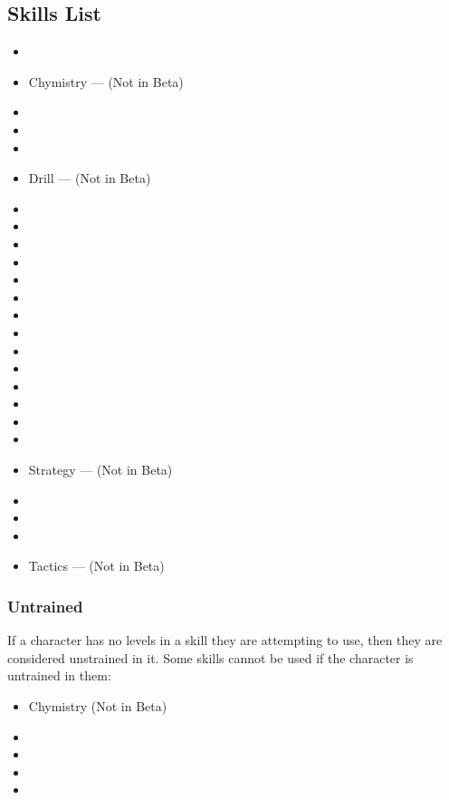 \documentclass[oneside,11pt,english]{book}
\begin{document}
\subsection{Skills List}
\begin{itemize}
	[noitemsep]
	\item {}
	\item Chymistry --- (Not in Beta)
	\item {}
	\item {}
	\item {}
	\item Drill --- (Not in Beta)
	\item {}
	\item {}
	\item {}
	\item {}
	\item {}
	\item {}
	\item {}
	\item {}
	\item {}
	\item {}
	\item {}
	\item {}
	\item {}
	\item {}
	\item Strategy --- (Not in Beta)
	\item {}
	\item {}
	\item {}
	\item Tactics --- (Not in Beta)
\end{itemize}

\subsubsection{Untrained}\label{par:Untrained}
If a character has no levels in a skill they are attempting to use, then they are considered unstrained in it. Some skills cannot be used if the character is untrained in them:
	\begin{itemize}
		[noitemsep]
		\item Chymistry (Not in Beta)
		\item {}
		\item {}
		\item {}
		\item {}
	\end{itemize}
\end{document}
